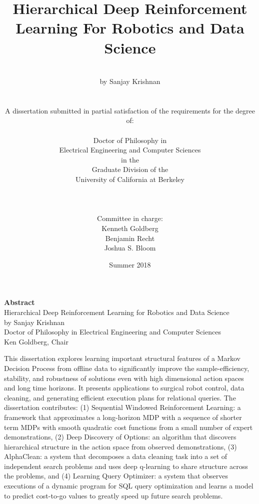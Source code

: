 \documentclass[oneside,12pt]{book} %
\title{Hierarchical Deep Reinforcement Learning For Robotics and Data Science}
\author
{\\
\normalsize{by Sanjay Krishnan}\\
\\
\\
\normalsize{A dissertation submitted in partial satisfaction of the
requirements for the degree of:}\\
\\
\normalsize{Doctor of Philosophy in}\\
\normalsize{Electrical Engineering and Computer Sciences}\\
\normalsize{in the}\\
\normalsize{Graduate Division of the}\\
\normalsize{University of California at Berkeley}\\
\\
\\
\\
\normalsize{Committee in charge: }\\
\normalsize{Kenneth Goldberg}\\
\normalsize{Benjamin Recht}\\
\normalsize{Joshua S. Bloom}\\
}
\date{Summer 2018}
\begin{document}
 




\maketitle 






{\centering \textbf{Abstract} \\ 
Hierarchical Deep Reinforcement Learning for Robotics and Data Science \\ \vspace{0.5em}
by Sanjay Krishnan \\ 
Doctor of Philosophy in Electrical Engineering and Computer Sciences \\
Ken Goldberg, Chair\\
\vspace{1.5em}}

This dissertation explores learning important structural features of a Markov Decision Process from offline data to significantly improve the sample-efficiency, stability, and robustness of solutions even with high dimensional action spaces and long time horizons.
It presents applications to surgical robot control, data cleaning, and generating efficient execution plans for relational queries. 
The dissertation contributes: (1) Sequential Windowed Reinforcement Learning: a framework that approximates a long-horizon MDP with a sequence of shorter term MDPs with smooth quadratic cost functions from a small number of expert demonstrations, (2) Deep Discovery of Options: an algorithm that discovers hierarchical structure in the action space from observed demonstrations, (3) AlphaClean: a system that decomposes a data cleaning task into a set of independent search problems and uses deep q-learning to share structure across the problems, and (4) Learning Query Optimizer: a system that observes executions of a dynamic program for SQL query optimization and learns a model to predict cost-to-go values to greatly speed up future search problems. 

\tableofcontents
\end{document}

